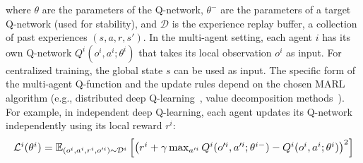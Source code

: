 \documentclass[sigconf]{acmart}
\begin{document}
where $\theta$ are the parameters of the Q-network, $\theta^-$ are the parameters of a target Q-network (used for stability), 
and $\mathcal{D}$ is the experience replay buffer, a collection of past experiences $(s, a, r, s')$.
%
In the multi-agent setting, each agent $i$ has its own Q-network $Q^i(o^i, a^i; \theta^i)$ that takes its local observation $o^i$ as input.  
For centralized training, the global state $s$ can be used as input. 
The specific form of the multi-agent Q-function and the update rules depend on the chosen MARL algorithm (e.g., distributed deep Q-learning~\cite{ong2015distributed}, value decomposition methods~\cite{DBLP:conf/icml/SonKKHY19}).  
For example, in independent deep Q-learning, each agent updates its Q-network independently using its local reward $r^i$:
\begin{equation}
  \resizebox{\linewidth}{!}{$
  \mathcal{L}^i(\theta^i) = \mathbb{E}_{(o^i, a^i, r^i, o'^i) \sim \mathcal{D}^i} \left[ \left( r^i + \gamma \max_{a'^i} Q^i(o'^i, a'^i; \theta^{i-}) - Q^i(o^i, a^i; \theta^i) \right)^2 \right]
  $}
  \end{equation}
\end{document}

